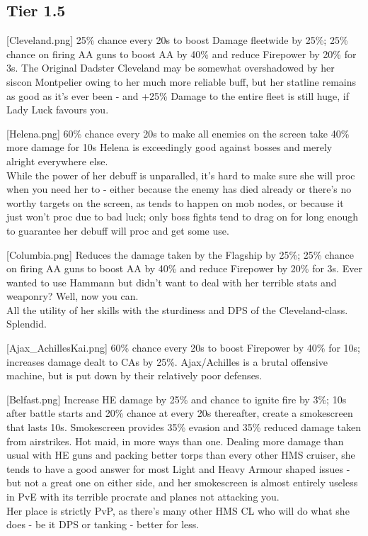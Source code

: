  
\newpage
\subsection{Tier 1.5}
[Cleveland.png]
{25\% chance every 20s to boost Damage fleetwide by 25\%; 25\% chance on firing AA guns to boost AA by 40\% and reduce Firepower by 20\% for 3s.}
{The Original Dadster}
{Cleveland may be somewhat overshadowed by her siscon Montpelier owing to her much more reliable buff, but her statline remains as good as it's ever been - and +25\% Damage to the entire fleet is still huge, if Lady Luck favours you.}

[Helena.png]
{ 60\% chance every 20s to make all enemies on the screen take 40\% more damage for 10s}
{}
{Helena is exceedingly good against bosses and merely alright everywhere else. \\
While the power of her debuff is unparalled, it's hard to make sure she will proc when you need her to - either because the enemy has died already or there's no worthy targets on the screen, as tends to happen on mob nodes, or because it just won't proc due to bad luck; only boss fights tend to drag on for long enough to guarantee her debuff will proc and get some use.}
 
[Columbia.png]
{Reduces the damage taken by the Flagship by 25\%; 25\% chance on firing AA guns to boost AA by 40\% and reduce Firepower by 20\% for 3s.}
{}
{Ever wanted to use Hammann but didn't want to deal with her terrible stats and weaponry? Well, now you can.\\
All the utility of her skills with the sturdiness and DPS of the Cleveland-class. Splendid.}

[Ajax_AchillesKai.png]
{60\% chance every 20s to boost Firepower by 40\% for 10s; increases damage dealt to CAs by 25\%.}
{}
{Ajax/Achilles is a brutal offensive machine, but is put down by their relatively poor defenses.}

[Belfast.png]
{Increase HE damage by 25\% and chance to ignite fire by 3\%; 10s after battle starts and 20\% chance at every 20s thereafter, create a smokescreen that lasts 10s. Smokescreen provides 35\% evasion and 35\% reduced damage taken from airstrikes.}
{}
{Hot maid, in more ways than one. Dealing more damage than usual with HE guns and packing better torps than every other HMS cruiser, she tends to have a good answer for most Light and Heavy Armour shaped issues - but not a great one on either side, and her smokescreen is almost entirely useless in PvE with its terrible procrate and planes not attacking you.\\
Her place is strictly PvP, as there's many other HMS CL who will do what she does - be it DPS or tanking - better for less.}

